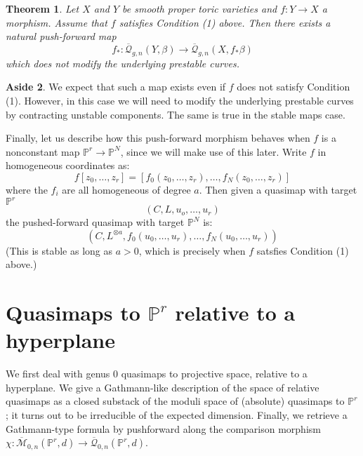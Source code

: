 \documentclass[11pt]{amsart}
\newcommand{\M}[4]{\overline{\mathcal M}_{#1,#2}(#3,#4)}
\newcommand{\Q}[4]{\overline{\mathcal Q}_{#1,#2}(#3,#4)}
\newcommand{\PP}{\mathbb P}
\renewcommand{\to}{\rightarrow}
\newcommand{\comp}{\chi}
\theoremstyle{plain}
\newtheorem{thm}{Theorem}[section]
\theoremstyle{definition}
\newtheorem{aside}[thm]{Aside}
\begin{document}
\begin{thm} Let $X$ and $Y$ be smooth proper toric varieties and $f : Y \to X$ a morphism. Assume that $f$ satisfies Condition (1) above. Then there exists a natural push-forward map
\begin{equation*} f_* : \Q{g}{n}{Y}{\beta} \to \Q{g}{n}{X}{f_* \beta} \end{equation*}
which does not modify the underlying prestable curves.\end{thm}

\begin{aside} We expect that such a map exists even if $f$ does not satisfy Condition (1). However, in this case we will need to modify the underlying prestable curves by contracting unstable components. The same is true in the stable maps case. \end{aside}

Finally, let us describe how this push-forward morphism behaves when $f$ is a nonconstant map $\PP^r \to \PP^N$, since we will make use of this later. Write $f$ in homogeneous coordinates as:
\begin{equation*} f[z_0, \ldots, z_r] = [f_0(z_0, \ldots, z_r), \ldots, f_N(z_0, \ldots, z_r)] \end{equation*}
where the $f_i$ are all homogeneous of degree $a$. Then given a quasimap with target $\PP^r$
\begin{equation*} (C, L, u_o, \ldots, u_r) \end{equation*}
the pushed-forward quasimap with target $\PP^N$ is:
\begin{equation*} (C, L^{\otimes a}, f_0(u_0, \ldots, u_r) , \ldots, f_N(u_0, \ldots, u_r)) \end{equation*}
(This is stable as long as $a > 0$, which is precisely when $f$ satsfies Condition (1) above.)

\section{Quasimaps to $\PP^r$ relative to a hyperplane}

We first deal with genus 0 quasimaps to projective space, relative to a hyperplane. We give a Gathmann-like description of the space of relative quasimaps as a closed substack of the moduli space of (absolute) quasimaps to $\PP^r$; it turns out to be irreducible of the expected dimension. Finally, we retrieve a Gathmann-type formula by pushforward along the comparison morphism $\comp\colon \M{0}{n}{\PP^r}{d}\to\Q{0}{n}{\PP^r}{d}$.
\end{document}
